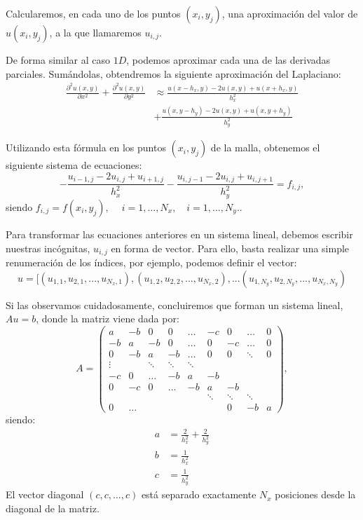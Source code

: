 \documentclass[11pt,spanish,a4wide]{article}
\begin{document}
Calcularemos, en cada uno de los puntos $(x_i,y_j)$, una aproximación del
valor de $u(x_i,y_j)$, a la que llamaremos $u_{i,j}$.

De forma similar al caso $1D$, podemos aproximar cada una de las
derivadas parciales. Sumándolas, obtendremos la siguiente aproximación
del Laplaciano:
\begin{align*}
  \frac{\partial^2 u(x,y) }{\partial x^2}
  +
  \frac{\partial^2 u(x,y)}{\partial y^2} 
  & \approx \frac{u(x-h_x,y)-2u(x,y)+u(x+h_x,y)}{h_x^2} 
  \\
  &+
  \frac{u(x,y-h_y)-2u(x,y)+u(x,y+h_y)}{h_y^2}
\end{align*}

Utilizando esta fórmula en los puntos $(x_i,y_j)$ de la malla,
obtenemos el siguiente sistema de ecuaciones:
$$
-\frac{u_{i-1,j}-2u_{i,j} + u_{i+1,j}}{h_x^2} 
-\frac{u_{i,j-1}-2u_{i,j} + u_{i,j+1}}{h_y^2} 
= f_{i,j},
$$
siendo $f_{i,j}=f(x_{i},y_j), \  \quad i=1,\dots,N_x,  \quad i=1,\dots,N_y.$.

Para transformar las ecuaciones anteriores en un sistema lineal,
debemos escribir nuestras incógnitas, $u_{i,j}$ en forma de
vector. Para ello, basta realizar una simple renumeración de los
índices, por ejemplo, podemos definir el vector:
$$
u=[(u_{1,1}, u_{2,1},...,u_{N_x,1}), (u_{1,2}, u_{2,2},...,u_{N_x,2}),
...
(u_{1,N_y}, u_{2,N_y},...,u_{N_x,N_y})
$$


Si las observamos cuidadosamente, concluiremos que forman un sistema
lineal, $Au=b$, donde la matriz viene dada por:
$$
A=
\begin{pmatrix}
   a & -b &  0 &  0 & \dots & -c & 0 & \dots & 0 \\
  -b &  a & -b &  0 & \dots & 0 & -c & \dots & 0\\
   0 & -b &  a & -b & \dots & 0 & 0 & \ddots & 0 \\
   \vdots &    & \ddots & \ddots & \ddots & \\
   -c & 0 & \dots & -b & a  & -b \\
   0 & -c &  0 & \dots & -b & a  & -b \\
     & & &&    & \ddots & \ddots & \ddots & \\
   0 & \dots & &  & & & 0 & -b & a  
 \end{pmatrix},
$$
siendo: 
\begin{align*}
  a&=\frac{2}{h_x^2}+\frac{2}{h_y^2} \\
  b&=\frac{1}{h_x^2} \\
  c&=\frac{1}{h_y^2}
\end{align*}
El vector diagonal $(c,c,\dots,c)$ está separado exactamente $N_x$
posiciones desde la diagonal de la matriz.
\end{document}
